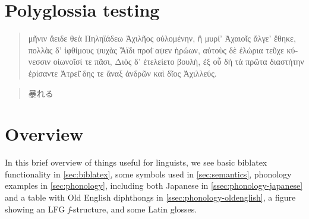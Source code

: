 \documentclass[a4paper,12pt,twoside]{article}
\begin{document}

\tableofcontents
\thispagestyle{toc}
\newpage

\listoffigures
\thispagestyle{lof}
\newpage

\listoftables
\thispagestyle{lot}
\newpage

\title{\thistitle}
\author{\thisauthor}

\maketitle
\thispagestyle{plain}

\section{Polyglossia testing}

\begin{quote}
    \begin{greek}
        μῆνιν ἄειδε θεὰ Πηληϊάδεω Ἀχιλῆος οὐλομένην, ἣ μυρί' Ἀχαιοῖς ἄλγε' ἔθηκε,
        πολλὰς δ' ἰφθίμους ψυχὰς Ἄϊδι προί̈ αψεν ἡρώων, αὐτοὺς δὲ ἑλώρια τεῦχε
        κύνεσσιν οἰωνοῖσί τε πᾶσι, Διὸς δ' ἐτελείετο βουλή, ἐξ οὗ δὴ τὰ πρῶτα
        διαστήτην ἐρίσαντε Ἀτρεί̈ δης τε ἄναξ ἀνδρῶν καὶ δῖος Ἀχιλλεύς.
    \end{greek}
\end{quote}

\begin{quote}
    \begin{latin}
        \lipsum[1]
    \end{latin}
\end{quote}

\begin{quote}
    \begin{japanese}
        暴れる
    \end{japanese}
\end{quote}

\section{Overview}

In this brief overview of things useful for linguists, we see basic biblatex
functionality in \autoref{sec:biblatex}, some symbols used in
\autoref{sec:semantics}, phonology examples in \autoref{sec:phonology},
including both Japanese in \autoref{ssec:phonology-japanese} and a table with
Old English diphthongs in \autoref{ssec:phonology-oldenglish}, a figure showing
an LFG \textit{f}-structure, and some Latin glosses.
\end{document}
